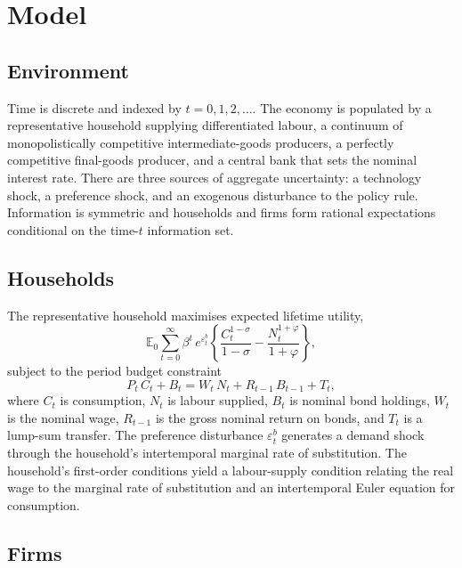 \section{Model}
\label{sec:model}

\subsection{Environment}
\label{sec:model_env}

Time is discrete and indexed by $t=0,1,2,\ldots$. The economy is
populated by a representative household supplying differentiated labour,
a continuum of monopolistically competitive intermediate-goods producers,
a perfectly competitive final-goods producer, and a central bank that
sets the nominal interest rate. There are three sources of aggregate
uncertainty: a technology shock, a preference shock, and an exogenous
disturbance to the policy rule. Information is symmetric and households
and firms form rational expectations conditional on the time-$t$
information set.

\subsection{Households}
\label{sec:model_hh}

The representative household maximises expected lifetime utility,
\begin{equation}
  \mathbb{E}_{0}\sum_{t=0}^{\infty}\beta^{t}\,e^{\varepsilon_{t}^{b}}
  \left\{\frac{C_{t}^{1-\sigma}}{1-\sigma}-\frac{N_{t}^{1+\varphi}}{1+\varphi}\right\},
  \label{eq:utility}
\end{equation}
subject to the period budget constraint
\begin{equation}
  P_{t}\,C_{t}+B_{t}=W_{t}\,N_{t}+R_{t-1}\,B_{t-1}+T_{t},
  \label{eq:budget}
\end{equation}
where $C_{t}$ is consumption, $N_{t}$ is labour supplied, $B_{t}$ is
nominal bond holdings, $W_{t}$ is the nominal wage, $R_{t-1}$ is the
gross nominal return on bonds, and $T_{t}$ is a lump-sum transfer. The
preference disturbance $\varepsilon_{t}^{b}$ generates a demand shock
through the household's intertemporal marginal rate of substitution.
The household's first-order conditions yield a labour-supply condition
relating the real wage to the marginal rate of substitution and an
intertemporal Euler equation for consumption.

\subsection{Firms}
\label{sec:model_firms}

